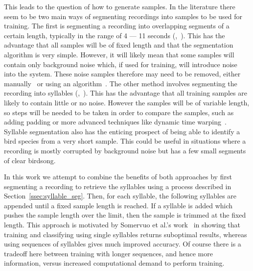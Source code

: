 This leads to the question of how to generate samples. In the literature there
seem to be two main ways of segmenting recordings into samples to be used for
training. The first is segmenting a recording into overlapping segments of a
certain length, typically in the range of 4 --- 11 seconds
(\cite{yan2021birdsong},~\cite{crous2019polyphonic}). This has the advantage
that all samples will be of fixed length and that the segmentation algorithm is
very simple. However, it will likely mean that some samples will contain only
background noise which, if used for training, will introduce noise into the
system. These noise samples therefore may need to be removed, either
manually~\cite{yan2021birdsong} or using an
algorithm~\cite{narasimhan2017simultaneous}. The other method involves
segmenting the recording into syllables
(\cite{fagerlund2007bird},~\cite{ramashini2022robust}). This has the advantage
that all training samples are likely to contain little or no noise. However the
samples will be of variable length, so steps will be needed to be taken in order
to compare the samples, such as adding padding or more advanced techniques like
dynamic time warping~\cite{somervuo2006parametric}. Syllable segmentation also
has the enticing prospect of being able to identify a bird species from a very
short sample. This could be useful in situations where a recording is mostly
corrupted by background noise but has a few small segments of clear birdsong.

In this work we attempt to combine the benefits of both approaches by first
segmenting a recording to retrieve the syllables using a process described in
Section~\ref{ssec:syllable_seg}. Then, for each syllable, the
following syllables are appended until a fixed sample length is reached. If a
syllable is added which pushes the sample length over the limit, then the sample
is trimmed at the fixed length. This approach is motivated by Somervuo et al.'s
work~\cite{somervuo2006parametric} in showing that training and classifying
using single syllables returns suboptimal results, whereas using sequences of
syllables gives much improved accuracy. Of course there is a tradeoff here
between training with longer sequences, and hence more information, versus
increased computational demand to perform training.

